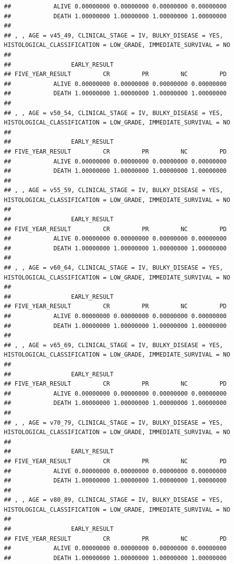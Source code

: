 \documentclass[]{article}
\begin{document}
\begin{verbatim}
##            ALIVE 0.00000000 0.00000000 0.00000000 0.00000000
##            DEATH 1.00000000 1.00000000 1.00000000 1.00000000
## 
## , , AGE = v45_49, CLINICAL_STAGE = IV, BULKY_DISEASE = YES, HISTOLOGICAL_CLASSIFICATION = LOW_GRADE, IMMEDIATE_SURVIVAL = NO
## 
##                 EARLY_RESULT
## FIVE_YEAR_RESULT         CR         PR         NC         PD
##            ALIVE 0.00000000 0.00000000 0.00000000 0.00000000
##            DEATH 1.00000000 1.00000000 1.00000000 1.00000000
## 
## , , AGE = v50_54, CLINICAL_STAGE = IV, BULKY_DISEASE = YES, HISTOLOGICAL_CLASSIFICATION = LOW_GRADE, IMMEDIATE_SURVIVAL = NO
## 
##                 EARLY_RESULT
## FIVE_YEAR_RESULT         CR         PR         NC         PD
##            ALIVE 0.00000000 0.00000000 0.00000000 0.00000000
##            DEATH 1.00000000 1.00000000 1.00000000 1.00000000
## 
## , , AGE = v55_59, CLINICAL_STAGE = IV, BULKY_DISEASE = YES, HISTOLOGICAL_CLASSIFICATION = LOW_GRADE, IMMEDIATE_SURVIVAL = NO
## 
##                 EARLY_RESULT
## FIVE_YEAR_RESULT         CR         PR         NC         PD
##            ALIVE 0.00000000 0.00000000 0.00000000 0.00000000
##            DEATH 1.00000000 1.00000000 1.00000000 1.00000000
## 
## , , AGE = v60_64, CLINICAL_STAGE = IV, BULKY_DISEASE = YES, HISTOLOGICAL_CLASSIFICATION = LOW_GRADE, IMMEDIATE_SURVIVAL = NO
## 
##                 EARLY_RESULT
## FIVE_YEAR_RESULT         CR         PR         NC         PD
##            ALIVE 0.00000000 0.00000000 0.00000000 0.00000000
##            DEATH 1.00000000 1.00000000 1.00000000 1.00000000
## 
## , , AGE = v65_69, CLINICAL_STAGE = IV, BULKY_DISEASE = YES, HISTOLOGICAL_CLASSIFICATION = LOW_GRADE, IMMEDIATE_SURVIVAL = NO
## 
##                 EARLY_RESULT
## FIVE_YEAR_RESULT         CR         PR         NC         PD
##            ALIVE 0.00000000 0.00000000 0.00000000 0.00000000
##            DEATH 1.00000000 1.00000000 1.00000000 1.00000000
## 
## , , AGE = v70_79, CLINICAL_STAGE = IV, BULKY_DISEASE = YES, HISTOLOGICAL_CLASSIFICATION = LOW_GRADE, IMMEDIATE_SURVIVAL = NO
## 
##                 EARLY_RESULT
## FIVE_YEAR_RESULT         CR         PR         NC         PD
##            ALIVE 0.00000000 0.00000000 0.00000000 0.00000000
##            DEATH 1.00000000 1.00000000 1.00000000 1.00000000
## 
## , , AGE = v80_89, CLINICAL_STAGE = IV, BULKY_DISEASE = YES, HISTOLOGICAL_CLASSIFICATION = LOW_GRADE, IMMEDIATE_SURVIVAL = NO
## 
##                 EARLY_RESULT
## FIVE_YEAR_RESULT         CR         PR         NC         PD
##            ALIVE 0.00000000 0.00000000 0.00000000 0.00000000
##            DEATH 1.00000000 1.00000000 1.00000000 1.00000000

\end{verbatim}
\end{document}
